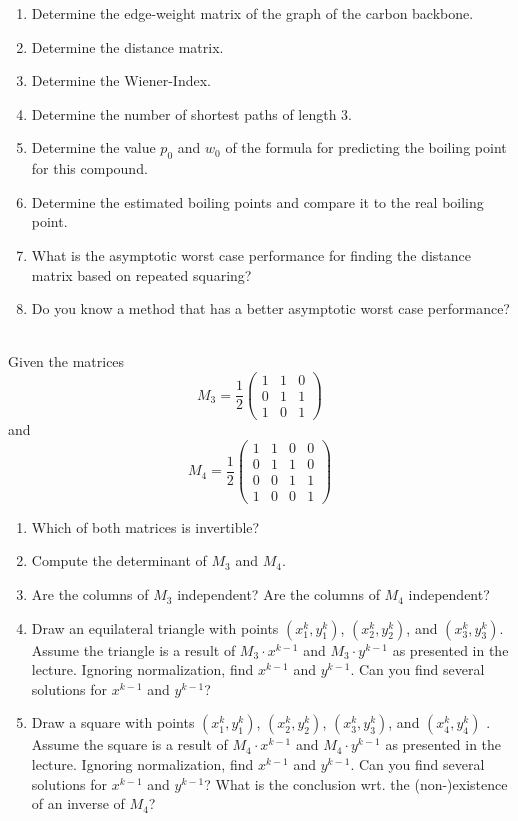 \documentclass[10pt]{article}
\begin{document}
\begin{enumerate}
\item Determine the edge-weight matrix of the graph of the carbon backbone.
\item Determine the distance matrix.
\item Determine the Wiener-Index.
\item Determine the number of shortest paths of length 3.
\item Determine the value $p_0$ and $w_0$ of the formula for predicting the boiling point for this compound.
\item Determine the estimated boiling points and compare it to the real boiling point.
\item What is the asymptotic worst case performance for finding the distance matrix based on repeated squaring?
\item Do you know a method that has a better asymptotic worst case performance?
\end{enumerate}

\\

Given the matrices  \begin{equation*}  M_3 = \frac{1}{2}\left(\begin{array}{ccc}
1 & 1 & 0\\
0 & 1 & 1\\
1 & 0 & 1
\end{array}\right) 
\end{equation*} and \begin{equation*}  M_4 =  \frac{1}{2}\left(\begin{array}{cccc}
1 & 1 & 0 & 0  \\
0 & 1 & 1 & 0  \\
0 & 0 & 1 & 1  \\
1 & 0 & 0 & 1  
\end{array}\right) 
\end{equation*}
\begin{enumerate}
\item Which of both matrices is invertible?
  \item Compute the determinant of $M_3$ and $M_4$.
\item Are the columns of $M_3$ independent? Are the columns of $M_4$ independent?
\item Draw an equilateral triangle with points $(x_1^k, y_1^k)$, $(x_2^k, y_2^k)$, and $(x_3^k, y_3^k)$. Assume the triangle is a result of $M_3\cdot x^{k-1}$ and $M_3\cdot y^{k-1}$ as presented in the lecture. Ignoring normalization, find $x^{k-1}$ and $y^{k-1}$. Can you find several solutions for $x^{k-1}$ and $y^{k-1}$?
\item Draw a square with points $(x_1^k, y_1^k)$, $(x_2^k, y_2^k)$, $(x_3^k, y_3^k)$, and $(x_4^k, y_4^k)$ . Assume the square is a result of $M_4\cdot x^{k-1}$ and $M_4\cdot y^{k-1}$ as presented in the lecture. Ignoring normalization, find $x^{k-1}$ and $y^{k-1}$. Can you find several solutions for $x^{k-1}$ and $y^{k-1}$? What is the conclusion wrt. the (non-)existence of an inverse of $M_4$?
\end{enumerate}
\end{document}
